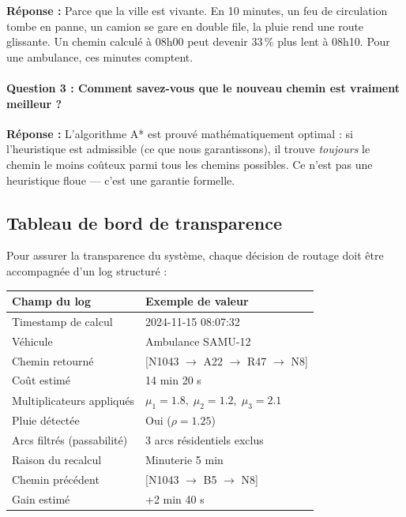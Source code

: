 \documentclass[12pt,a4paper]{article}
\theoremstyle{definition}
\theoremstyle{remark}
\begin{document}
\noindent\textbf{Réponse :} Parce que la ville est vivante. En 10 minutes,
un feu de circulation tombe en panne, un camion se gare en double file,
la pluie rend une route glissante. Un chemin calculé à 08h00 peut devenir
33\,\% plus lent à 08h10. Pour une ambulance, ces minutes comptent.

\paragraph{Question 3 : \og{}Comment savez-vous que le nouveau chemin est vraiment meilleur ?\fg{}}

\noindent\textbf{Réponse :} L'algorithme A* est prouvé mathématiquement
optimal : si l'heuristique est admissible (ce que nous garantissons), il
trouve \emph{toujours} le chemin le moins coûteux parmi tous les chemins
possibles. Ce n'est pas une heuristique floue — c'est une garantie formelle.

\subsection{Tableau de bord de transparence}

Pour assurer la transparence du système, chaque décision de routage
doit être accompagnée d'un log structuré :

\begin{center}
\begin{tabular}{ll}
  \toprule
  \textbf{Champ du log} & \textbf{Exemple de valeur} \\
  \midrule
  Timestamp de calcul & 2024-11-15 08:07:32 \\
  Véhicule & Ambulance SAMU-12 \\
  Chemin retourné & [N1043 $\to$ A22 $\to$ R47 $\to$ N8] \\
  Coût estimé & 14 min 20 s \\
  Multiplicateurs appliqués & $\mu_1 = 1.8,\; \mu_2 = 1.2,\; \mu_3 = 2.1$ \\
  Pluie détectée & Oui ($\rho = 1.25$) \\
  Arcs filtrés (passabilité) & 3 arcs résidentiels exclus \\
  Raison du recalcul & Minuterie 5 min \\
  Chemin précédent & [N1043 $\to$ B5 $\to$ N8] \\
  Gain estimé & +2 min 40 s \\
  \bottomrule
\end{tabular}
\end{center}
\end{document}
